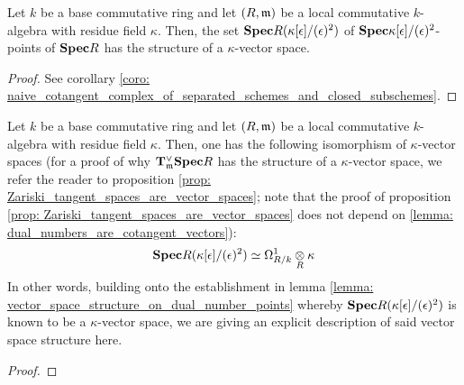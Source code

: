             \begin{lemma} \label{lemma: vector_space_structure_on_dual_number_points}
                Let $k$ be a base commutative ring and let $(R, \mathfrak{m})$ be a local commutative $k$-algebra with residue field $\kappa$. Then, the set $\mathbf{Spec} R(\kappa[\epsilon]/(\epsilon)^2)$ of $\mathbf{Spec} \kappa[\epsilon]/(\epsilon)^2$-points of $\mathbf{Spec} R$ has the structure of a $\kappa$-vector space. 
            \end{lemma}
                \begin{proof}
                    See corollary \ref{coro: naive_cotangent_complex_of_separated_schemes_and_closed_subschemes}.
                \end{proof}
            
            \begin{lemma} \label{lemma: dual_numbers_are_cotangent_vectors} 
                Let $k$ be a base commutative ring and let $(R, \mathfrak{m})$ be a local commutative $k$-algebra with residue field $\kappa$. Then, one has the following isomorphism of $\kappa$-vector spaces (for a proof of why $\mathbf{T}^{\vee}_{\mathfrak{m}}\mathbf{Spec} R$ has the structure of a $\kappa$-vector space, we refer the reader to proposition \ref{prop: Zariski_tangent_spaces_are_vector_spaces}; note that the proof of proposition \ref{prop: Zariski_tangent_spaces_are_vector_spaces} does not depend on \ref{lemma: dual_numbers_are_cotangent_vectors}):
                    $$\Spec R(\kappa[\e]/(\e)^2) \cong \Omega^1_{R/k} \tensor_R \kappa$$
                In other words, building onto the establishment in lemma \ref{lemma: vector_space_structure_on_dual_number_points} whereby $\mathbf{Spec} R(\kappa[\epsilon]/(\epsilon)^2)$ is known to be a $\kappa$-vector space, we are giving an explicit description of said vector space structure here.
            \end{lemma}
                \begin{proof}
                    
                \end{proof}
            
